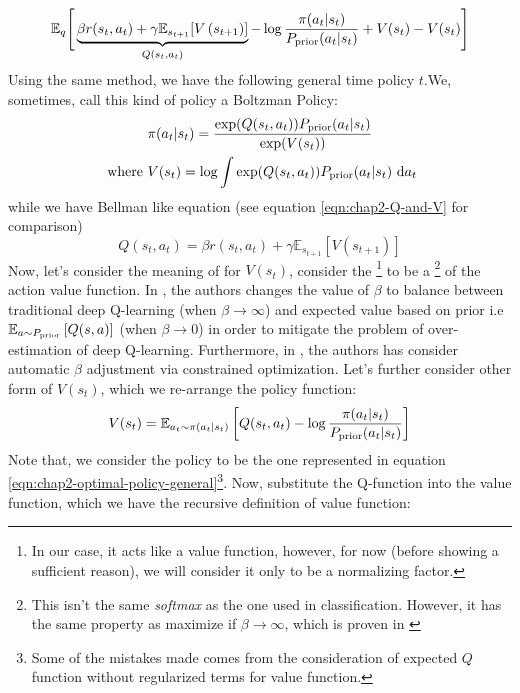 \begin{equation}
    \mathbb{E}_{q} \Bigg[\underbrace{\beta r(s_t, a_t) + \gamma\mathbb{E}_{s_{t+1}}[V\left( s_{t+1} \right)]}_{Q(s_t, a_t)} - \log \frac{\pi(a_t | s_t)}{P_{\text{prior}}(a_t | s_t)} + V(s_t) - V(s_t) \Bigg] 
\end{equation}
Using the same method, we have the following general time policy $t$.We, sometimes, call this kind of policy a Boltzman Policy:
\begin{equation}
\begin{aligned}
\label{eqn:chap2-optimal-policy-general}
    &\pi(a_t | s_t) = \frac{\exp(Q(s_t, a_t)) P_{\text{prior}}(a_t | s_t)}{\exp(V(s_t))} \\
    \text{ where }&V(s_t) = \log \int \exp(Q(s_t, a_t)) P_{\text{prior}}(a_t | s_t) \ \mathrm{d} a_t
\end{aligned}
\end{equation}
while we have Bellman like equation (see equation \ref{eqn:chap2-Q-and-V} for comparison)
\begin{equation}
    Q(s_t, a_t) = \beta r(s_t, a_t) + \gamma\mathbb{E}_{s_{t+1}}[V(s_{t+1})]
\end{equation}
Now, let's consider the meaning of for $V(s_{t})$, \cite{levine2018reinforcement} consider the \footnote{In our case, it acts like a value function, however, for now (before showing a sufficient reason), we will consider it only to be a normalizing factor.} to be a \footnote{This isn't the same \textit{softmax} as the one used in classification. However, it has the same property as maximize if $\beta \rightarrow \infty$, which is proven in \cite{fellows2019virel} } of the action value function. In \cite{leibfried2017information}, the authors changes the value of $\beta$ to balance between traditional deep Q-learning (when $\beta \rightarrow \infty$) and expected value based on prior i.e $\mathbb{E}_{a\sim P_{\text{prior}}}\left[ Q(s, a) \right]$ (when $\beta \rightarrow 0$) in order to mitigate the problem of over-estimation of deep Q-learning. Furthermore, in \cite{haarnoja2018softb}, the authors has consider automatic $\beta$ adjustment via constrained optimization. Let's further consider other form of $V(s_t)$, which we re-arrange the policy function:
\begin{equation}
\label{eqn:chap2-soft-value-def-expand}
    V(s_t) = \mathbb{E}_{a_t \sim \pi(a_t | s_t)}\left[ Q(s_t, a_t) - \log \frac{\pi(a_t | s_t)}{P_{\text{prior}}(a_t | s_t)} \right]
\end{equation}
Note that, we consider the policy to be the one represented in equation \ref{eqn:chap2-optimal-policy-general}\footnote{Some of the mistakes made comes from the consideration of expected $Q$ function without regularized terms for value function.}. Now, substitute the Q-function into the value function, which we have the recursive definition of value function:
